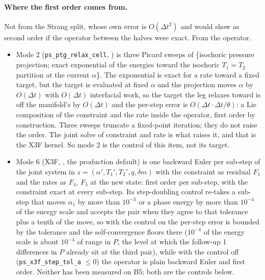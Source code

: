 \documentclass[11pt,a4paper]{article}
\newcommand{\code}[1]{\texttt{\small #1}}
\newcommand{\Dt}{\Delta t}
\begin{document}
\paragraph{Where the first order comes from.}  Not from the Strang
split, whose own error is $O(\Dt^2)$ and would show as second order if
the operator between the halves were exact.  From the operator.
\begin{itemize}[nosep]
\item Mode 2 (\code{ps\_ptg\_relax\_cell}, ) is three
      Picard sweeps of \{isochoric pressure projection; exact
      exponential of the energies toward the isochoric $T_1 = T_2$
      partition at the current $\alpha$\}.  The exponential is exact
      for a rate toward a fixed target, but the target is evaluated at
      fixed $\alpha$ and the projection moves $\alpha$ by $O(\Dt)$ with
      $O(\Dt)$ interfacial work, so the target the leg relaxes toward is
      off the manifold's by $O(\Dt)$ and the per-step error is
      $O(\Dt\cdot\Dt/\theta)$: a Lie composition of the constraint and
      the rate inside the operator, first order by construction.  Three
      sweeps truncate a fixed-point iteration; they do not raise the
      order.  The joint solve of constraint and rate is what raises it,
      and that is the X3F kernel.  So mode 2 is the control of this
      item, not its target.
\item Mode 6 (X3F, , the production default) is
      one backward Euler per sub-step of the joint system in
      $z = (\alpha', T_1', T_2', q, \delta m)$ with the constraint as
      residual $F_1$ and the rates as $F_4$, $F_5$ at the new state:
      first order per sub-step, with the constraint exact at every
      sub-step.  Its step-doubling control re-takes a sub-step that
      moves $\alpha_1$ by more than $10^{-3}$ or a phase energy by more
      than $10^{-4}$ of the energy scale and accepts the pair when they
      agree to that tolerance plus a tenth of the move, so with the
      control on the per-step error is bounded by the tolerance and the
      self-convergence floors there ($10^{-4}$ of the energy scale is
      about $10^{-4}$ of range in $P$, the level at which the follow-up 1
      differences in $P$ already sit at the third pair), while with the
      control off (\code{ps\_x3f\_step\_tol\_a} $\le 0$) the operator is
      plain backward Euler and first order.  Neither has been measured
      on B5; both are the controls below.
\end{itemize}
\end{document}
